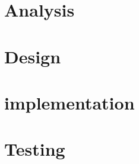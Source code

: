 




	\newpage
	\listoffixmes



	\tableofcontents
	
\begin{titlepage}
\end{titlepage}

\part{Analysis}
	
	
	
	
\part{Design}
	
	
	
\part{implementation}
	\pagestyle{plain}

\part{Testing}

\label{chap:bib}




	



